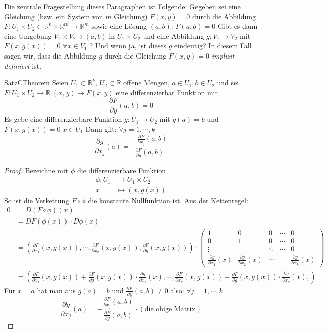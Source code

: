 Die zentrale Fragestellung dieses Paragraphen ist Folgende: Gegeben sei eine Gleichung (bzw. ein System von $ m $ Gleichung)
$ F (x,y) = 0 $ durch die Abbildung $ F: U_1 \times U_2 \subset \mathbb{R}^{k} \times \mathbb{R}^m  \to \mathbb{R}^m  $ sowie 
eine Lösung $ (a,b) $: $ F \left( a,b \right) = 0 $ Gibt es dann eine Umgebung $ V_1 \times V_2 \ni (a,b)  $ in $ U_1 \times U_2 $ 
und eine Abbildung $ g: V_1 \to V_2 $ mit $ F \left( x, g \left(x\right)  \right) = 0 \; \forall x \in  V_1 $ ? Und wenn ja, ist 
dieses $ g $ eindeutig? In diesem Fall sagen wir, dass die Abbildung $ g $ durch die Gleichung $ F (x,y) = 0 $ \textit{implizit
 definiert} ist. 
 \begin{ibox}[44]{Satz}{CTheorem}
     Seien $ U_1 \subset \mathbb{R}^{k},\, U_2 \subset \mathbb{R}  $ offene Mengen, $ a \in U_1, b \in U_2 $ und sei 
		 $ F: U_{1} \times U_2 \to \mathbb{R} \; (x,y) \mapsto F (x,y) $ eine differenzierbar Funktion mit 
		 $$ \frac{\partial F}{\partial y} (a,b) = 0 $$
		 Es gebe eine differenzierbare Funktion $ g: U_1 \to U_2  $ mit $ g (a) = b $ und $ F \left( x,g (x) \right) = 0 \; x \in U_1 $ 
		 Dann gilt: $ \forall j = 1, \cdots,  k $ 
		 $$ \frac{\partial g}{\partial x_j} (a) = \frac{ - \frac{\partial F}{\partial x_j} (a,b)}{ \frac{\partial F}{\partial y} (a,b)}  $$
 \end{ibox}
\begin{proof}
	Bezeichne mit $ \phi $ die differenzierbare Funktion 
	\begin{align*} \phi: U_1 &\to U_1 \times U_2 \\ x &\mapsto (x, g(x)) \end{align*}
So ist die Verkettung $ F \circ \phi $ die konstante Nullfunktion ist. Aus der Kettenregel:
\begin{align*}
	0 &= D \left( F \circ \phi \right)(x) \\
		&= D F (\phi(x)) \cdot D \phi \left(x\right)\\
		&= \left( \frac{\partial F}{\partial x_1} (x, g(x)) , \cdots, \frac{\partial F}{\partial x_k}  (x, g(x)), 
		\frac{\partial F}{\partial g}  (x, g(x))\right) \cdot \begin{pmatrix}
			1 &0 &0 &\cdots &0\\
			0 &1 &0 &\cdots &0\\
			\vdots & &\ddots &\cdots &0\\
			\frac{\partial g}{\partial x_1} (x) &\frac{\partial g}{\partial x_2} (x) &\cdots & &\frac{\partial g}{\partial x_k} (x) 
		\end{pmatrix}\\
		&= \left( \frac{\partial F}{\partial x_1} (x,g(x))+ \frac{\partial F}{\partial g} (x,g(x)) \cdot \frac{\partial g}{\partial x_1} 
		(x), \cdots, \frac{\partial F}{\partial x_k} (x,g(x))+ \frac{\partial F}{\partial g} (x,g(x)) \cdot \frac{\partial g}{\partial x_k}
		(x), \right) 	
 \end{align*}
Für $ x = a $ hat man aus $ g(a) = b $ und $ \frac{\partial F}{\partial y} (a,b) \neq 0  $ also: $ \forall j = 1, \cdots,  k $ 
$$ \frac{\partial g}{\partial x_j} (a) = - \frac{ \frac{\partial F}{\partial x_j} (a,b)}{ \frac{\partial F}{\partial y} (a,b)} \cdot
(\text{die obige Matrix})$$
\end{proof}
